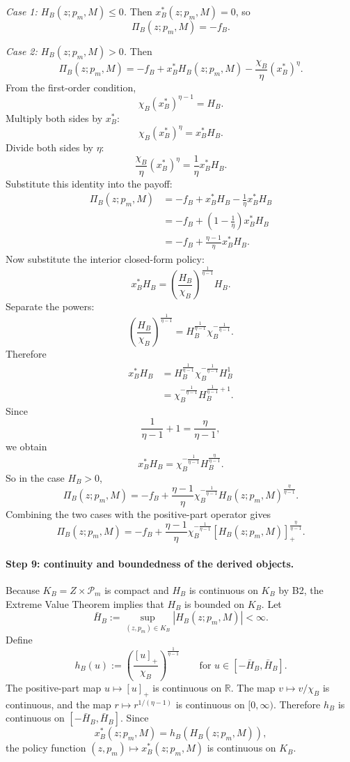 \textit{Case 1: $H_B(z;p_m,M)\le 0$.}
Then $x_B^*(z;p_m,M)=0$, so
\[
\Pi_B(z;p_m,M)=-f_B.
\]

\textit{Case 2: $H_B(z;p_m,M)>0$.}
Then
\[
\Pi_B(z;p_m,M)
=
-f_B+x_B^*H_B(z;p_m,M)-\frac{\chi_B}{\eta}(x_B^*)^\eta.
\]
From the first-order condition,
\[
\chi_B(x_B^*)^{\eta-1}=H_B.
\]
Multiply both sides by $x_B^*$:
\[
\chi_B(x_B^*)^\eta=x_B^*H_B.
\]
Divide both sides by $\eta$:
\[
\frac{\chi_B}{\eta}(x_B^*)^\eta=\frac{1}{\eta}x_B^*H_B.
\]
Substitute this identity into the payoff:
\begin{align*}
\Pi_B(z;p_m,M)
&=
-f_B+x_B^*H_B-\frac{1}{\eta}x_B^*H_B\\
&=
-f_B+\left(1-\frac{1}{\eta}\right)x_B^*H_B\\
&=
-f_B+\frac{\eta-1}{\eta}x_B^*H_B.
\end{align*}
Now substitute the interior closed-form policy:
\[
x_B^*H_B
=
\left(\frac{H_B}{\chi_B}\right)^{\frac{1}{\eta-1}}H_B.
\]
Separate the powers:
\[
\left(\frac{H_B}{\chi_B}\right)^{\frac{1}{\eta-1}}
=
H_B^{\frac{1}{\eta-1}}\chi_B^{-\frac{1}{\eta-1}}.
\]
Therefore
\begin{align*}
x_B^*H_B
&=
H_B^{\frac{1}{\eta-1}}\chi_B^{-\frac{1}{\eta-1}}H_B^1\\
&=
\chi_B^{-\frac{1}{\eta-1}}H_B^{\frac{1}{\eta-1}+1}.
\end{align*}
Since
\[
\frac{1}{\eta-1}+1=\frac{\eta}{\eta-1},
\]
we obtain
\[
x_B^*H_B=\chi_B^{-\frac{1}{\eta-1}}H_B^{\frac{\eta}{\eta-1}}.
\]
So in the case $H_B>0$,
\[
\Pi_B(z;p_m,M)
=
-f_B+\frac{\eta-1}{\eta}\chi_B^{-\frac{1}{\eta-1}}H_B(z;p_m,M)^{\frac{\eta}{\eta-1}}.
\]
Combining the two cases with the positive-part operator gives
\begin{equation}
\Pi_B(z;p_m,M)
=
-f_B+\frac{\eta-1}{\eta}\chi_B^{-\frac{1}{\eta-1}}[H_B(z;p_m,M)]_+^{\frac{\eta}{\eta-1}}.
\label{eq:p2B_optimized_rev}
\end{equation}

\paragraph{Step 9: continuity and boundedness of the derived objects.}
Because $K_B=Z\times\mathcal P_m$ is compact and $H_B$ is continuous on $K_B$ by B2, the Extreme Value Theorem implies that $H_B$ is bounded on $K_B$. Let
\[
\bar H_B:=\sup_{(z,p_m)\in K_B}|H_B(z;p_m,M)|<\infty.
\]
Define
\[
h_B(u):=\left(\frac{[u]_+}{\chi_B}\right)^{\frac{1}{\eta-1}}
\qquad\text{for }u\in[-\bar H_B,\bar H_B].
\]
The positive-part map $u\mapsto [u]_+$ is continuous on $\mathbb R$. The map $v\mapsto v/\chi_B$ is continuous, and the map $r\mapsto r^{1/(\eta-1)}$ is continuous on $[0,\infty)$. Therefore $h_B$ is continuous on $[-\bar H_B,\bar H_B]$. Since
\[
x_B^*(z;p_m,M)=h_B(H_B(z;p_m,M)),
\]
the policy function $(z,p_m)\mapsto x_B^*(z;p_m,M)$ is continuous on $K_B$.

